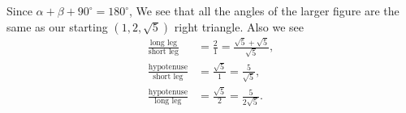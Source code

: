\documentclass[nooutcomes,noauthor]{ximera}
\begin{document}
\begin{question}
\begin{freeResponse}
\begin{enumerate}
\begin{center}
      \end{center}
      Since $\alpha+\beta+90^\circ = 180^\circ$, We see that all the angles of the
      larger figure are the same as our starting $(1,2,\sqrt{5})$
      right triangle. Also we see
      \begin{align*}
        \frac{\text{long leg}}{\text{short leg}} &= \frac{2}{1} = \frac{\sqrt{5}+\sqrt{5}}{\sqrt{5}},\\
        \frac{\text{hypotenuse}}{\text{short leg}} &= \frac{\sqrt{5}}{1} = \frac{5}{\sqrt{5}},\\
        \frac{\text{hypotenuse}}{\text{long leg}} &= \frac{\sqrt{5}}{2} = \frac{5}{2\sqrt{5}}.\\
      \end{align*}
    \end{enumerate}
  \end{freeResponse}
\end{question}

\mynewpage
\end{document}
